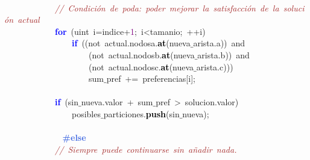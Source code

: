 \mbox{} \\
\mbox{}\ \ \ \ \ \ \ \ \ \ \ \ \textit{\textcolor{Brown}{//\ Condición\ de\ poda:\ poder\ mejorar\ la\ satisfacción\ de\ la\ solución\ actual}} \\
\mbox{}\ \ \ \ \ \ \ \ \ \ \ \ \textbf{\textcolor{Blue}{for}}\ \textcolor{BrickRed}{(}\textcolor{TealBlue}{uint}\ i\textcolor{BrickRed}{=}indice\textcolor{BrickRed}{+}\textcolor{Purple}{1}\textcolor{BrickRed}{;}\ i\textcolor{BrickRed}{\textless{}}tamanio\textcolor{BrickRed}{;}\ \textcolor{BrickRed}{++}i\textcolor{BrickRed}{)} \\
\mbox{}\ \ \ \ \ \ \ \ \ \ \ \ \ \ \ \ \textbf{\textcolor{Blue}{if}}\ \textcolor{BrickRed}{((}\textcolor{TealBlue}{not}\ actual\textcolor{BrickRed}{.}nodosa\textcolor{BrickRed}{.}\textbf{\textcolor{Black}{at}}\textcolor{BrickRed}{(}nueva$\_$arista\textcolor{BrickRed}{.}a\textcolor{BrickRed}{))}\ and \\
\mbox{}\ \ \ \ \ \ \ \ \ \ \ \ \ \ \ \ \ \ \ \ \textcolor{BrickRed}{(}\textcolor{TealBlue}{not}\ actual\textcolor{BrickRed}{.}nodosb\textcolor{BrickRed}{.}\textbf{\textcolor{Black}{at}}\textcolor{BrickRed}{(}nueva$\_$arista\textcolor{BrickRed}{.}b\textcolor{BrickRed}{))}\ and \\
\mbox{}\ \ \ \ \ \ \ \ \ \ \ \ \ \ \ \ \ \ \ \ \textcolor{BrickRed}{(}\textcolor{TealBlue}{not}\ actual\textcolor{BrickRed}{.}nodosc\textcolor{BrickRed}{.}\textbf{\textcolor{Black}{at}}\textcolor{BrickRed}{(}nueva$\_$arista\textcolor{BrickRed}{.}c\textcolor{BrickRed}{)))} \\
\mbox{}\ \ \ \ \ \ \ \ \ \ \ \ \ \ \ \ \ \ \ \ sum$\_$pref\ \textcolor{BrickRed}{+=}\ preferencias\textcolor{BrickRed}{[}i\textcolor{BrickRed}{];} \\
\mbox{} \\
\mbox{}\ \ \ \ \ \ \ \ \ \ \ \ \textbf{\textcolor{Blue}{if}}\ \textcolor{BrickRed}{(}sin$\_$nueva\textcolor{BrickRed}{.}valor\ \textcolor{BrickRed}{+}\ sum$\_$pref\ \textcolor{BrickRed}{\textgreater{}}\ solucion\textcolor{BrickRed}{.}valor\textcolor{BrickRed}{)} \\
\mbox{}\ \ \ \ \ \ \ \ \ \ \ \ \ \ \ \ posibles$\_$particiones\textcolor{BrickRed}{.}\textbf{\textcolor{Black}{push}}\textcolor{BrickRed}{(}sin$\_$nueva\textcolor{BrickRed}{);} \\
\mbox{} \\
\mbox{}\textbf{\textcolor{RoyalBlue}{\ \ \ \ \ \ \ \ \ \ \ \ \#else}} \\
\mbox{}\ \ \ \ \ \ \ \ \ \ \ \ \textit{\textcolor{Brown}{//\ Siempre\ puede\ continuarse\ sin\ añadir\ nada.}} \\
